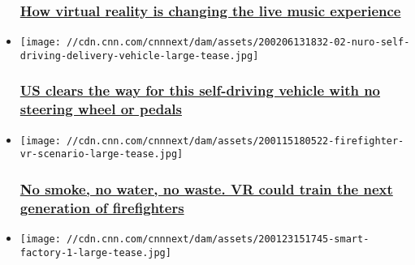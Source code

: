 \begin{itemize}
  \hypertarget{how-virtual-reality-is-changing-the-live-music-experience}{%
  \subsubsection{\texorpdfstring{\href{/2020/02/27/tech/vr-live-music-intl/index.html}{How
  virtual reality is changing the live music
  experience}}{How virtual reality is changing the live music experience}}\label{how-virtual-reality-is-changing-the-live-music-experience}}
\item
  \href{/2020/02/06/tech/nuro-self-driving-vehicle-houston-dot/index.html}{}

  \texttt{[image: //cdn.cnn.com/cnnnext/dam/assets/200206131832-02-nuro-self-driving-delivery-vehicle-large-tease.jpg]}

  \hypertarget{us-clears-the-way-for-this-self-driving-vehicle-with-no-steering-wheel-or-pedals}{%
  \subsubsection{\texorpdfstring{\href{/2020/02/06/tech/nuro-self-driving-vehicle-houston-dot/index.html}{US
  clears the way for this self-driving vehicle with no steering wheel or
  pedals}}{US clears the way for this self-driving vehicle with no steering wheel or pedals}}\label{us-clears-the-way-for-this-self-driving-vehicle-with-no-steering-wheel-or-pedals}}
\item
  \href{/2020/01/29/tech/virtual-reality-firefighter-training/index.html}{}

  \texttt{[image: //cdn.cnn.com/cnnnext/dam/assets/200115180522-firefighter-vr-scenario-large-tease.jpg]}

  \hypertarget{no-smoke-no-water-no-waste-vr-could-train-the-next-generation-of-firefighters}{%
  \subsubsection{\texorpdfstring{\href{/2020/01/29/tech/virtual-reality-firefighter-training/index.html}{No
  smoke, no water, no waste. VR could train the next generation of
  firefighters}}{No smoke, no water, no waste. VR could train the next generation of firefighters}}\label{no-smoke-no-water-no-waste-vr-could-train-the-next-generation-of-firefighters}}
\item
  \href{/2020/01/23/business/bmw-regensburg-smart-factory/index.html}{}

  \texttt{[image: //cdn.cnn.com/cnnnext/dam/assets/200123151745-smart-factory-1-large-tease.jpg]}


\end{itemize}
